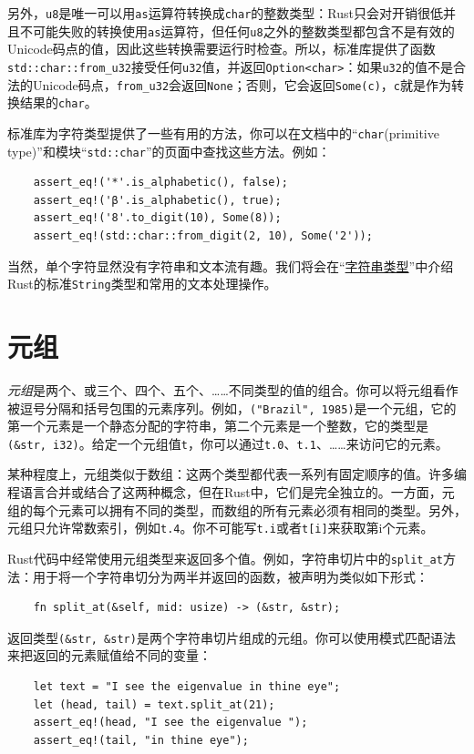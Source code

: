 另外，\texttt{u8}是唯一可以用\texttt{as}运算符转换成\texttt{char}的整数类型：Rust只会对开销很低并且不可能失败的转换使用\texttt{as}运算符，但任何\texttt{u8}之外的整数类型都包含不是有效的Unicode码点的值，因此这些转换需要运行时检查。所以，标准库提供了函数\texttt{std::char::from\_u32}接受任何\texttt{u32}值，并返回\texttt{Option<char>}：如果\texttt{u32}的值不是合法的Unicode码点，\texttt{from\_u32}会返回\texttt{None}；否则，它会返回\texttt{Some(c)}，\texttt{c}就是作为转换结果的\texttt{char}。

标准库为字符类型提供了一些有用的方法，你可以在文档中的“\texttt{char}(primitive type)”和模块“\texttt{std::char}”的页面中查找这些方法。例如：
\begin{verbatim}
    assert_eq!('*'.is_alphabetic(), false);
    assert_eq!('β'.is_alphabetic(), true);
    assert_eq!('8'.to_digit(10), Some(8));
    assert_eq!(std::char::from_digit(2, 10), Some('2'));
\end{verbatim}

当然，单个字符显然没有字符串和文本流有趣。我们将会在“\hyperref[string]{字符串类型}”中介绍Rust的标准\texttt{String}类型和常用的文本处理操作。

\section{元组}
\emph{元组}是两个、或三个、四个、五个、……不同类型的值的组合。你可以将元组看作被逗号分隔和括号包围的元素序列。例如，\texttt{("Brazil", 1985)}是一个元组，它的第一个元素是一个静态分配的字符串，第二个元素是一个整数，它的类型是\texttt{(\&str, i32)}。给定一个元组值\texttt{t}，你可以通过\texttt{t.0}、\texttt{t.1}、……来访问它的元素。

某种程度上，元组类似于数组：这两个类型都代表一系列有固定顺序的值。许多编程语言合并或结合了这两种概念，但在Rust中，它们是完全独立的。一方面，元组的每个元素可以拥有不同的类型，而数组的所有元素必须有相同的类型。另外，元组只允许常数索引，例如\texttt{t.4}。你不可能写\texttt{t.i}或者\texttt{t[i]}来获取第i个元素。

Rust代码中经常使用元组类型来返回多个值。例如，字符串切片中的\texttt{split\_at}方法：用于将一个字符串切分为两半并返回的函数，被声明为类似如下形式：
\begin{verbatim}
    fn split_at(&self, mid: usize) -> (&str, &str);
\end{verbatim}

返回类型\texttt{(\&str, \&str)}是两个字符串切片组成的元组。你可以使用模式匹配语法来把返回的元素赋值给不同的变量：
\begin{verbatim}
    let text = "I see the eigenvalue in thine eye";
    let (head, tail) = text.split_at(21);
    assert_eq!(head, "I see the eigenvalue ");
    assert_eq!(tail, "in thine eye");
\end{verbatim}

